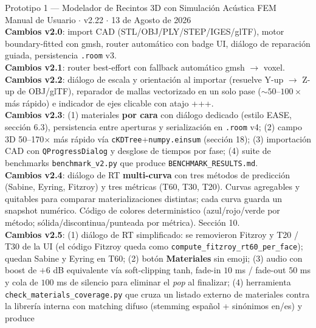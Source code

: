 \documentclass[11pt, a4paper]{article}
\newcommand{\tecla}[1]{\texttt{\small\fbox{#1}}}
\newcommand{\menu}[1]{\textbf{\guillemotleft #1\guillemotright}}
\begin{document}
\begin{center}
  \small\textcolor{cGray}{%
    Prototipo 1 --- Modelador de Recintos 3D con Simulación Acústica FEM\\
    Manual de Usuario $\cdot$ v2.22 $\cdot$ 13 de Agosto de 2026\\[2pt]
    \textbf{Cambios v2.0}: import CAD (STL/OBJ/PLY/STEP/IGES/glTF), motor
    boundary-fitted con gmsh, router automático con badge UI, diálogo de
    reparación guiada, persistencia \texttt{.room} v3.\\[2pt]
    \textbf{Cambios v2.1}: router best-effort con fallback automático
    gmsh $\to$ voxel.\\[2pt]
    \textbf{Cambios v2.2}: diálogo de escala y orientación al importar
    (resuelve Y-up $\to$ Z-up de OBJ/glTF), reparador de mallas
    vectorizado en un solo pase ($\sim 50$--$100\times$ más rápido) e
    indicador de ejes clicable con atajo
    \tecla{Ctrl}+\tecla{Shift}+\tecla{Alt}+\tecla{X/Y/Z}.\\[2pt]
    \textbf{Cambios v2.3}: (1) materiales \textbf{por cara} con
    diálogo dedicado (estilo EASE, sección 6.3), persistencia entre
    aperturas y serialización en \texttt{.room} v4;
    (2) campo 3D 50--170$\times$ más rápido vía
    \texttt{cKDTree}+\texttt{numpy.einsum} (sección 18);
    (3) importación CAD con \texttt{QProgressDialog} y desglose de
    tiempos por fase; (4) suite de benchmarks \texttt{benchmark\_v2.py}
    que produce \texttt{BENCHMARK\_RESULTS.md}.\\[2pt]
    \textbf{Cambios v2.4}: diálogo de RT \textbf{multi-curva} con
    tres métodos de predicción (Sabine, Eyring, Fitzroy) y tres
    métricas (T60, T30, T20). Curvas agregables y quitables para
    comparar materializaciones distintas; cada curva guarda un
    snapshot numérico. Código de colores deterministico (azul/rojo/verde
    por método; sólida/discontinua/punteada por métrica). Sección 10.\\[2pt]
    \textbf{Cambios v2.5}: (1) diálogo de RT simplificado: se removieron
    Fitzroy y T20 / T30 de la UI (el código Fitzroy queda como
    \texttt{compute\_fitzroy\_rt60\_per\_face}); quedan Sabine y Eyring
    en T60; (2) botón \menu{Materiales} sin emoji; (3) audio con boost
    de $+6$ dB equivalente vía soft-clipping tanh, fade-in $10$ ms /
    fade-out $50$ ms y cola de $100$ ms de silencio para eliminar el
    \emph{pop} al finalizar; (4) herramienta \texttt{check\_materials\_coverage.py}
    que cruza un listado externo de materiales contra la librería interna
    con matching difuso (stemming español + sinónimos en/es) y produce
}
\end{center}
\end{document}
